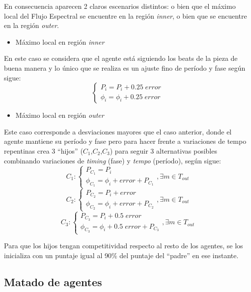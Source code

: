 \documentclass[12pt,a4paper,titlepage]{report}
\begin{document}
En consecuencia aparecen 2 claros escenarios distintos: o bien que el máximo local del Flujo Espectral se encuentre en la región \emph{inner}, o bien que se encuentre en la región \emph{outer}.\\

\begin{itemize} \item Máximo local en región \emph{inner}\end{itemize}
En este caso se considera que el agente está siguiendo los beats de la pieza de buena manera y lo único que se realiza es un ajuste fino de período y fase según sigue:
$$
\begin{cases}
P_i = P_i+0.25\;error\\
\phi_i = \phi_i+0.25\;error
\end{cases}
$$

\begin{itemize} \item Máximo local en región \emph{outer} \end{itemize}
Este caso corresponde a desviaciones mayores que el caso anterior, donde el agente mantiene su período y fase pero para hacer frente a variaciones de tempo repentinas crea 3 ``hijos'' ($C_1$,$C_2$,$C_3$) para seguir 3 alternativas posibles combinando variaciones de \emph{timing} (fase) y \emph{tempo} (período), según sigue:\\
\footnotesize
$$
C_1:
\begin{cases}
P_{C_1}=P_i\\
\phi _{C_1}=\phi _i + error + P_{C_1}
\end{cases}
, \exists m \in T_{out}
$$
$$
C_2:
\begin{cases}
P_{C_2}=P_i+error\\
\phi _{C_2}=\phi _i + error + P_{C_2}
\end{cases}
, \exists m \in T_{out}
$$
$$
C_3:
\begin{cases}
P_{C_3}=P_i+0.5\;error\\
\phi _{C_3}=\phi _i +0.5\;error + P_{C_3}
\end{cases}
, \exists m \in T_{out}
$$

\normalsize

Para que los hijos tengan competitividad respecto al resto de los agentes, se los inicializa con un puntaje igual al 90\% del puntaje del ``padre'' en ese instante.

\subsection{Matado de agentes}
\end{document}

